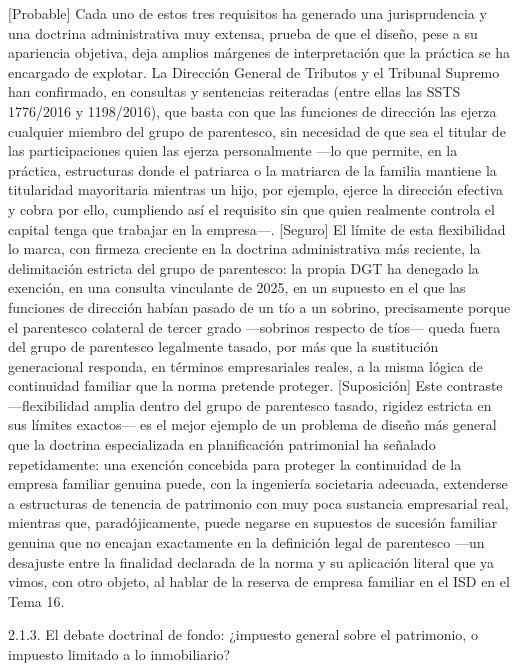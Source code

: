 \documentclass[10pt,a4paper]{article}
\begin{document}
[Probable] Cada uno de estos tres requisitos ha generado una jurisprudencia y una doctrina administrativa muy extensa, prueba de que el diseño, pese a su apariencia objetiva, deja amplios márgenes de interpretación que la práctica se ha encargado de explotar. La Dirección General de Tributos y el Tribunal Supremo han confirmado, en consultas y sentencias reiteradas (entre ellas las SSTS 1776/2016 y 1198/2016), que basta con que las funciones de dirección las ejerza cualquier miembro del grupo de parentesco, sin necesidad de que sea el titular de las participaciones quien las ejerza personalmente —lo que permite, en la práctica, estructuras donde el patriarca o la matriarca de la familia mantiene la titularidad mayoritaria mientras un hijo, por ejemplo, ejerce la dirección efectiva y cobra por ello, cumpliendo así el requisito sin que quien realmente controla el capital tenga que trabajar en la empresa—. [Seguro] El límite de esta flexibilidad lo marca, con firmeza creciente en la doctrina administrativa más reciente, la delimitación estricta del grupo de parentesco: la propia DGT ha denegado la exención, en una consulta vinculante de 2025, en un supuesto en el que las funciones de dirección habían pasado de un tío a un sobrino, precisamente porque el parentesco colateral de tercer grado —sobrinos respecto de tíos— queda fuera del grupo de parentesco legalmente tasado, por más que la sustitución generacional responda, en términos empresariales reales, a la misma lógica de continuidad familiar que la norma pretende proteger. [Suposición] Este contraste —flexibilidad amplia dentro del grupo de parentesco tasado, rigidez estricta en sus límites exactos— es el mejor ejemplo de un problema de diseño más general que la doctrina especializada en planificación patrimonial ha señalado repetidamente: una exención concebida para proteger la continuidad de la empresa familiar genuina puede, con la ingeniería societaria adecuada, extenderse a estructuras de tenencia de patrimonio con muy poca sustancia empresarial real, mientras que, paradójicamente, puede negarse en supuestos de sucesión familiar genuina que no encajan exactamente en la definición legal de parentesco —un desajuste entre la finalidad declarada de la norma y su aplicación literal que ya vimos, con otro objeto, al hablar de la reserva de empresa familiar en el ISD en el Tema 16.

2.1.3. El debate doctrinal de fondo: ¿impuesto general sobre el patrimonio, o impuesto limitado a lo inmobiliario?
\end{document}
